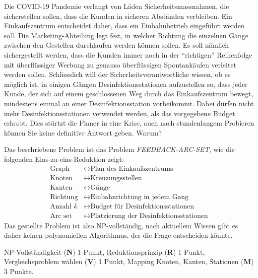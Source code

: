 Die COVID-19 Pandemie verlangt von Läden Sicherheitsmassnahmen, die
sicherstellen sollen, dass die Kunden in sicheren Abständen verbleiben.
Ein Einkaufszentrum entscheidet daher, dass ein Einbahnbetrieb
eingeführt werden soll.
Die Marketing-Abteilung legt fest, in welcher Richtung die einzelnen
Gänge zwischen den Gestellen durchlaufen werden können sollen.
Es soll nämlich sichergestellt werden, dass die Kunden immer noch 
in der ``richtigen'' Reihenfolge mit überflüssiger Werbung zu
genauso überflüssigen Spontankäufen verleitet werden sollen.
Schliesslich will der Sicherheitsverantwortliche wissen, ob es möglich
ist, in einigen Gängen Desinfektionsstationen aufzustellen so,
dass jeder Kunde, der sich auf einem geschlossenen Weg durch das
Einkaufszentrum bewegt, mindestens einmal an einer Desinfektionsstation
vorbeikommt.
Dabei dürfen nicht mehr Desinfektionsstationen verwendet werden, als
das vorgegebene Budget erlaubt.
Dies stürtzt die Planer in eine Krise, auch nach stundenlangem
Probieren können Sie keine definitive Antwort geben.
Warum?

\begin{loesung}
Das beschriebene Problem ist das Problem \textsl{FEEDBACK-ARC-SET},
wie die folgenden Eins-zu-eins-Reduktion zeigt:
\begin{align*}
\text{Graph} &\leftrightarrow \text{Plan des Einkaufszentrums}
\\
\text{Knoten}&\leftrightarrow \text{Kreuzungsstellen}
\\
\text{Kanten}&\leftrightarrow \text{Gänge}
\\
\text{Richtung}&\leftrightarrow \text{Einbahnrichtung in jedem Gang}
\\
\text{Anzahl $k$}&\leftrightarrow \text{Budget für Desinfektionsstationen}
\\
\text{Arc set}&\leftrightarrow \text{Platzierung der Desinfektionsstationen}
\end{align*}
Das gestellte Problem ist also NP-vollständig, nach aktuellem Wissen gibt
es daher keinen polynomiellen Algorithmus, der die Frage entscheiden könnte.
\end{loesung}

\begin{bewertung}
NP-Vollständigkeit ({\bf N}) 1 Punkt,
Reduktionsprinzip ({\bf R}) 1 Punkt,
Vergleichsproblem wählen ({\bf V}) 1 Punkt,
Mapping Knoten, Kanten, Stationen ({\bf M}) 3 Punkte.
\end{bewertung}

